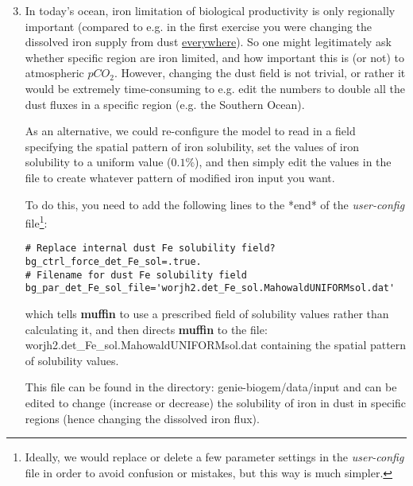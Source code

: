 \begin{enumerate}[noitemsep]
\setcounter{enumi}{2}

\vspace{1mm}
\item In today's ocean, iron limitation of biological productivity is only regionally important (compared to e.g. in the first exercise you were changing the dissolved iron supply from dust \uline{everywhere}). So one might legitimately ask whether specific region are iron limited, and how important this is (or not) to atmospheric \(pCO_{2}\). However, changing the dust field is not trivial, or rather it would be extremely time-consuming to e.g. edit the numbers to double all the dust fluxes in a specific region (e.g. the Southern Ocean).

\vspace{1mm}
As an alternative, we could re-configure the model to read in a field specifying the spatial pattern of iron solubility, set the values of iron solubility to a uniform value (\(0.1\%\)), and then simply edit the values in the file to create whatever pattern of modified iron input you want.

\newpage
%
To do this, you need to add the following lines to the *end* of the \textit{user-config} file\footnote{Ideally, we would replace or delete a few parameter settings in the \textit{user-config} file in order to avoid confusion or mistakes, but this way is much simpler.}:

\vspace{-1mm}\small\begin{verbatim}
# Replace internal dust Fe solubility field?
bg_ctrl_force_det_Fe_sol=.true.
# Filename for dust Fe solubility field
bg_par_det_Fe_sol_file='worjh2.det_Fe_sol.MahowaldUNIFORMsol.dat'
\end{verbatim}\normalsize\vspace{-1mm}
which tells \textbf{muffin} to use a prescribed field of solubility values rather than calculating it, and then directs \textbf{muffin} to the file: \textsf{\footnotesize worjh2.det\_Fe\_sol.MahowaldUNIFORMsol.dat} containing the spatial pattern of solubility values.

\vspace{1mm}
This file can be found in the directory: \textsf{\footnotesize genie-biogem/data/input} and can be edited to change (increase or decrease) the solubility of iron in dust in specific regions (hence changing the dissolved iron flux). 


\end{enumerate}
